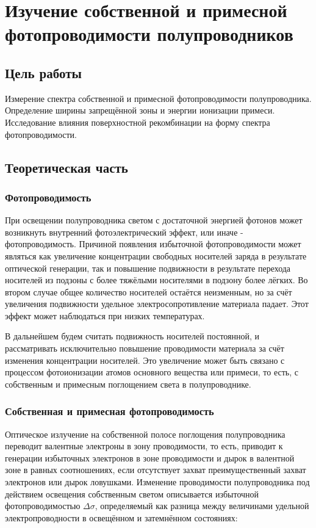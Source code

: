 \chapter{Изучение собственной и примесной фотопроводимости полупроводников}

\section{Цель работы}
Измерение спектра собственной и примесной фотопроводимости полупроводника. Определение ширины запрещённой зоны и энергии ионизации примеси. Исследование влияния поверхностной рекомбинации на форму спектра фотопроводимости.

\section{Теоретическая часть}
\subsection{Фотопроводимость}
При освещении полупроводника светом с достаточной энергией фотонов может возникнуть внутренний фотоэлектрический эффект, или иначе - фотопроводимость. Причиной появления  избыточной фотопроводимости может являться как увеличение концентрации свободных носителей заряда в результате оптической генерации, так и повышение подвижности в результате перехода носителей из подзоны с более тяжёлыми носителями в подзону более лёгких. Во втором случае общее количество носителей остаётся неизменным, но за счёт увеличения подвижности удельное электросопротивление материала падает. Этот эффект может наблюдаться при низких температурах.

В дальнейшем будем считать подвижность носителей постоянной, и рассматривать исключительно повышение проводимости материала за счёт изменения концентрации носителей. Это увеличение может быть связано с процессом фотоионизации атомов основного вещества или примеси, то есть, с собственным и примесным поглощением света в полупроводнике.

\subsection{Собственная и примесная фотопроводимость}
Оптическое излучение на собственной полосе поглощения полупроводника переводит валентные электроны в зону проводимости, то есть, приводит к генерации избыточных электронов в зоне проводимости и дырок в валентной зоне в равных соотношениях, если отсутствует захват преимущественный захват электронов или дырок ловушками.
Изменение проводимости полупроводника под действием освещения собственным светом описывается избыточной фотопроводимостью $\Delta \sigma$, определяемый как разница между величинами удельной электропроводности в освещённом и затемнённом состояниях:


